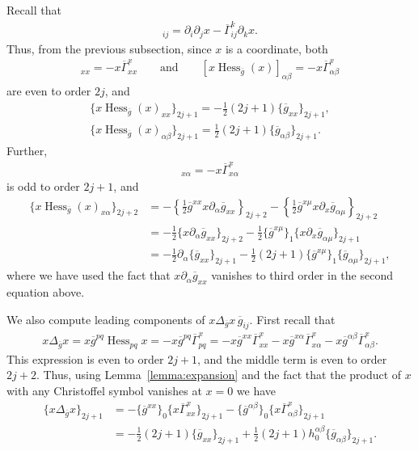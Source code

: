 \documentclass[pdftex]{sigma}
\numberwithin{equation}{section}
\newcommand{\olg}{\overline{g}}
\newcommand{\olGamma}{\overline{\Gamma}}
\newcommand{\gbar}{\overline{g}}
\DeclareMathOperator{\hess}{Hess}
\begin{document}
Recall that
\begin{gather*}
 [\hess_{\olg} x]_{ij} = \partial_i \partial_j x - \olGamma_{ij}^k \partial_k x. \end{gather*}
Thus, from the previous subsection, since $x$ is a coordinate, both
\begin{gather*} [x \hess_{\olg}(x)]_{xx} = - x \olGamma_{xx}^x \qquad \mbox{and} \qquad [x \hess_{\olg}(x)]_{\alpha \beta} = - x \olGamma_{\alpha \beta}^x
\end{gather*}
are even to order $2j$, and
\begin{gather} \label{eqn:hess-asymp-xx}
\{x \hess_{\olg}(x)_{xx}\}_{2j+1} = -\frac{1}{2} (2j+1) \{\olg_{xx}\}_{2j+1}, \\
\{x \hess_{\olg}(x)_{\alpha \beta}\}_{2j+1} = \frac{1}{2} (2j+1) \{\olg_{\alpha \beta}\}_{2j+1}.\label{eqn:hess-asymp-ab}
\end{gather}
Further,
\begin{gather*}
 [x \hess_{\olg}(x)]_{x\alpha} = -x \olGamma_{x\alpha}^x
\end{gather*}
is odd to order $2j+1$, and
\begin{align}
 \{x \hess_{\olg}(x)_{x\alpha}\}_{2j+2} &= -\left\{\frac{1}{2}\olg^{xx} x \partial_{\alpha} \olg_{xx}\right\}_{2j+2} - \left\{ \frac{1}{2} \olg^{x\mu} x \partial_x \olg_{\alpha \mu} \right\}_{2j+2} \nonumber \\
 &= -\frac{1}{2} \{ x \partial_{\alpha} \olg_{xx} \}_{2j+2} - \frac{1}{2} \{ \olg^{x \mu} \}_1 \{ x \partial_x \olg_{\alpha \mu} \}_{2j+1} \nonumber \\
 &= -\frac{1}{2} \partial_{\alpha} \{\olg_{xx}\}_{2j+1} - \frac{1}{2}(2j+1)\{ \olg^{x \mu} \}_1 \{ \olg_{\alpha \mu}\}_{2j+1},\label{eqn:mixed-ref-1}
\end{align}
where we have used the fact that $x \partial_{\alpha} \olg_{xx}$ vanishes to third order in the second equation above.

We also compute leading components of $x \Delta_{\olg} x \, \gbar_{ij}$. First recall that
\begin{gather*}
x \Delta_{\olg} x = x \gbar^{pq} \hess_{pq} x =-x \gbar^{pq} \olGamma_{pq}^x = -x\gbar^{xx} \olGamma_{xx}^x - x\gbar^{x\alpha} \olGamma_{x\alpha}^x - x\gbar^{\alpha \beta} \olGamma_{\alpha \beta}^x.
\end{gather*}
This expression is even to order $2j+1$, and the middle term is even to order $2j+2$. Thus, using Lemma~\ref{lemma:expansion} and the fact that the product of $x$ with any Christoffel symbol vanishes at $x=0$ we have
\begin{align*}
 \{x \Delta_{\olg} x\}_{2j+1} &= -\{ \gbar^{xx}\}_0 \{ x \olGamma_{xx}^x\}_{2j+1} - \{ \gbar^{\alpha \beta}\}_0 \{ x\olGamma_{\alpha \beta}^x\}_{2j+1} \\
 &= -\frac{1}{2} (2j+1) \{\olg_{xx}\}_{2j+1} +\frac{1}{2} (2j+1) h_0^{\alpha \beta}\{\olg_{\alpha \beta}\}_{2j+1}.
\end{align*}
\end{document}
